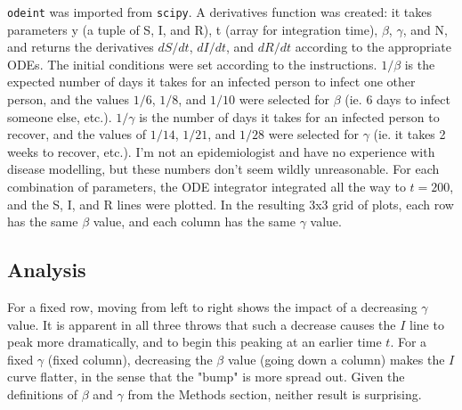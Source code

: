\documentclass{article}
\newcommand{\code}[1]{\texttt{#1}}
\begin{document}
\code{odeint} was imported from \code{scipy}. A derivatives function was created: it takes parameters y (a tuple of S, I, and R), t (array for integration time), $\beta$, $\gamma$, and N, and returns the derivatives $dS/dt$, $dI/dt$, and $dR/dt$ according to the appropriate ODEs. The initial conditions were set according to the instructions. $1/\beta$ is the expected number of days it takes for an infected person to infect one other person, and the values $1/6$, $1/8$, and $1/10$ were selected for $\beta$ (ie. 6 days to infect someone else, etc.). $1/\gamma$ is the number of days it takes for an infected person to recover, and the values of $1/14$, $1/21$, and $1/28$ were selected for $\gamma$ (ie. it takes 2 weeks to recover, etc.). I'm not an epidemiologist and have no experience with disease modelling, but these numbers don't seem wildly unreasonable. For each combination of parameters, the ODE integrator integrated all the way to $t=200$, and the S, I, and R lines were plotted. In the resulting 3x3 grid of plots, each row has the same $\beta$ value, and each column has the same $\gamma$ value. 

\subsection*{Analysis}

For a fixed row, moving from left to right shows the impact of a decreasing $\gamma$ value. It is apparent in all three throws that such a decrease causes the $I$ line to peak more dramatically, and to begin this peaking at an earlier time $t$. For a fixed $\gamma$ (fixed column), decreasing the $\beta$ value (going down a column) makes the $I$ curve flatter, in the sense that the "bump" is more spread out. Given the definitions of $\beta$ and $\gamma$ from the Methods section, neither result is surprising. 
\end{document}
